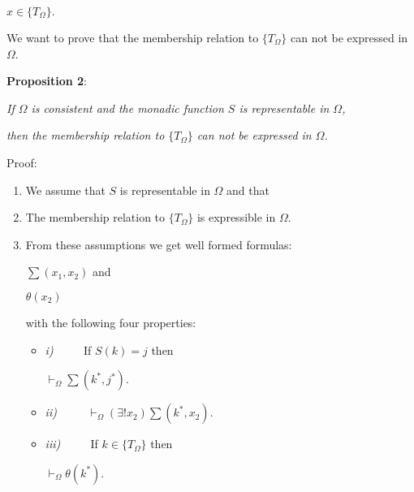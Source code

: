 \documentclass[12pt]{article}
\begin{document}
\begin{center} 
$x \in \lbrace T_{\Omega} \rbrace.$
\end{center}

We want to prove that the membership relation to $\{ T_{\Omega} \}$ can not be expressed in $\Omega$. 

\textbf{Proposition 2}:

\begin{center}
\emph{If $\Omega$ is consistent and the monadic function $S$ is representable in $\Omega$,}

\emph{then the membership relation to $\{ T_{\Omega} \}$ can not be expressed in $\Omega$.}
\end{center}

Proof:

\begin{enumerate}
\item We assume that $S$ is representable in $\Omega$ and that

\item The membership relation to $\{ T_{\Omega} \}$ is expressible in $\Omega$.

\item From these assumptions we get well formed formulas:

\begin{center}
$\sum (x_1, x_2)$ and

$\theta (x _2)$
\end{center}

with the following four properties:

\begin{itemize}
\item \emph{i)} $\hspace{2em}$ If $S (k) = j$ then

\begin{center}
$\vdash_{\Omega} \sum (k^*, j^*).$
\end{center}

\item \emph{ii)} $\hspace{2em}$ $\vdash_{\Omega} (\exists! x_2) \sum (k^*, x_2).$

\item \emph{iii)} $\hspace{2em}$ If $k \in \{ T_{\Omega} \}$ then

\begin{center}
$\vdash_{\Omega} \theta (k^*).$
\end{center}


\end{itemize}
\end{enumerate}
\end{document}
